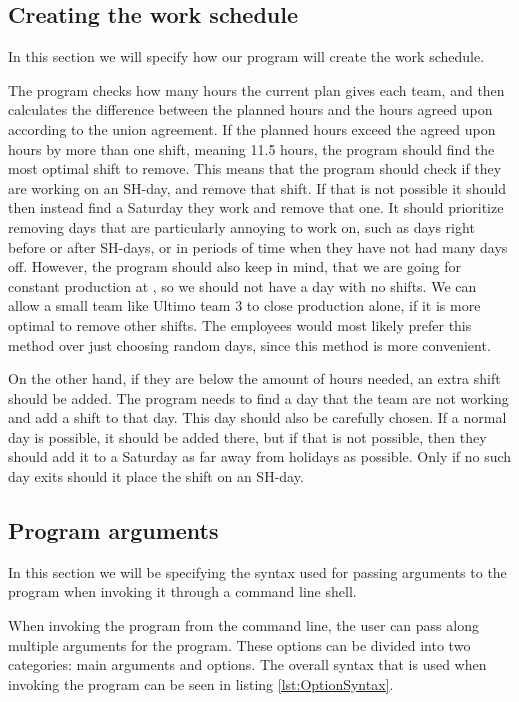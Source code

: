 \subsection{Creating the work schedule}
In this section we will specify how our program will create the work schedule.

The program checks how many hours the current plan gives each team, and then calculates the difference between the planned hours and the hours agreed upon according to the union agreement. If the planned hours exceed the agreed upon hours by more than one shift, meaning 11.5 hours, the program should find the most optimal shift to remove. This means that the program should check if they are working on an SH-day, and remove that shift. If that is not possible it should then instead find a Saturday they work and remove that one. It should prioritize removing days that are particularly annoying to work on, such as days right before or after SH-days, or in periods of time when they have not had many days off. However, the program should also keep in mind, that we are going for constant production at \siemens, so we should not have a day with no shifts. We can allow a small team like Ultimo team 3 to close production alone, if it is more optimal to remove other shifts. The employees would most likely prefer this method over just choosing random days, since this method is more convenient.

On the other hand, if they are below the amount of hours needed, an extra shift should be added. The program needs to find a day that the team are not working and add a shift to that day. This day should also be carefully chosen. If a normal day is possible, it should be added there, but if that is not possible, then they should add it to a Saturday as far away from holidays as possible. Only if no such day exits should it place the shift on an SH-day.

\subsection{Program arguments}
In this section we will be specifying the syntax used for passing arguments to the program when invoking it through a command line shell.

When invoking the program from the command line, the user can pass along multiple arguments for the program. These options can be divided into two categories: main arguments and options. The overall syntax that is used when invoking the program can be seen in listing \ref{lst:OptionSyntax}.

